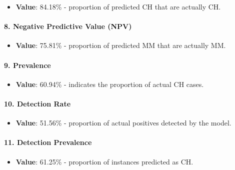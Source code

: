 \documentclass[
]{article}
\providecommand{\tightlist}{%
  \setlength{\itemsep}{0pt}\setlength{\parskip}{0pt}}
\begin{document}
\begin{itemize}
\tightlist
\item
  \textbf{Value}: 84.18\% - proportion of predicted CH that are actually
  CH.
\end{itemize}

\hypertarget{negative-predictive-value-npv-1}{%
\paragraph{\texorpdfstring{8. \textbf{Negative Predictive Value
(NPV)}}{8. Negative Predictive Value (NPV)}}\label{negative-predictive-value-npv-1}}

\begin{itemize}
\tightlist
\item
  \textbf{Value}: 75.81\% - proportion of predicted MM that are actually
  MM.
\end{itemize}

\hypertarget{prevalence-1}{%
\paragraph{\texorpdfstring{9.
\textbf{Prevalence}}{9. Prevalence}}\label{prevalence-1}}

\begin{itemize}
\tightlist
\item
  \textbf{Value}: 60.94\% - indicates the proportion of actual CH cases.
\end{itemize}

\hypertarget{detection-rate-1}{%
\paragraph{\texorpdfstring{10. \textbf{Detection
Rate}}{10. Detection Rate}}\label{detection-rate-1}}

\begin{itemize}
\tightlist
\item
  \textbf{Value}: 51.56\% - proportion of actual positives detected by
  the model.
\end{itemize}

\hypertarget{detection-prevalence-1}{%
\paragraph{\texorpdfstring{11. \textbf{Detection
Prevalence}}{11. Detection Prevalence}}\label{detection-prevalence-1}}

\begin{itemize}
\tightlist
\item
  \textbf{Value}: 61.25\% - proportion of instances predicted as CH.
\end{itemize}
\end{document}
